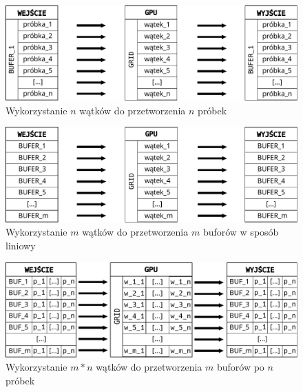 \begin{figure}[H]
    \centering
    \includegraphics[width=\textwidth]{./fig/przetwarzanie_1_do_1.pdf}
    \caption{Wykorzystanie $n$ wątków do przetworzenia $n$ próbek}
    \label{fig:Wykorzystanie n wątków do przetworzenia n próbek}
\end{figure}

\begin{figure}[H]
    \centering
    \includegraphics[width=\textwidth]{./fig/przetwarzanie_m_do_1.pdf}
    \caption{Wykorzystanie $m$ wątków do przetworzenia $m$ buforów w sposób liniowy}
    \label{fig:Wykorzystanie m wątków do przetworzenia m buforów}
\end{figure}

\begin{figure}[H]
    \centering
    \includegraphics[width=\textwidth]{./fig/przetwarzanie_m_do_m.pdf}
    \caption{Wykorzystanie $m*n$ wątków do przetworzenia $m$ buforów po $n$ próbek}
    \label{fig:Wykorzystanie m*n wątków do przetworzenia m buforów po n próbek}
\end{figure}